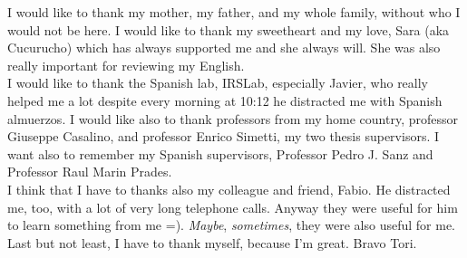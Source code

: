 

\begin{acknowledgements}

I would like to thank my mother, my father, and my whole family, without who I would not be here. I would like to thank my sweetheart and my love, Sara (aka Cucurucho) which has always supported me and she always will. She was also really important for reviewing my English.\\
I would like to thank the Spanish lab, IRSLab, especially Javier, who really helped me a lot despite every morning at 10:12 he distracted me with Spanish almuerzos. I would like also to thank professors from my home country, professor Giuseppe Casalino, and professor Enrico Simetti, my two thesis supervisors. I want also to remember my Spanish supervisors, Professor Pedro J. Sanz and Professor Raul Marin Prades.\\
I think that I have to thanks also my colleague and friend, Fabio. He distracted me, too, with a lot of very long telephone calls. Anyway they were useful for him to learn something from me =). \textit{Maybe}, \textit{sometimes}, they were also useful for me.\\
Last but not least, I have to thank myself, because I'm great. Bravo Tori.


\end{acknowledgements}
